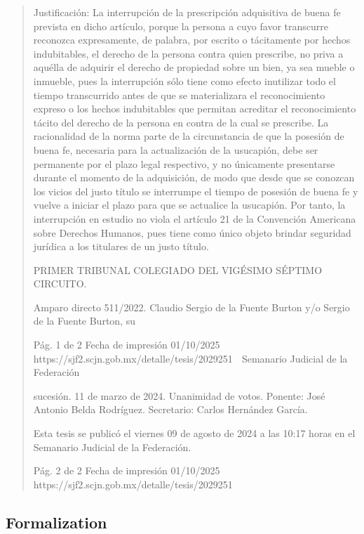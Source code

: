 \documentclass[11pt,a4paper]{article}
\begin{document}
\begin{quote}
Justificación: La interrupción de la prescripción adquisitiva de buena fe prevista en dicho artículo,
porque la persona a cuyo favor transcurre reconozca expresamente, de palabra, por escrito o
tácitamente por hechos indubitables, el derecho de la persona contra quien prescribe, no priva a
aquélla de adquirir el derecho de propiedad sobre un bien, ya sea mueble o inmueble, pues la
interrupción sólo tiene como efecto inutilizar todo el tiempo transcurrido antes de que se
materializara el reconocimiento expreso o los hechos indubitables que permitan acreditar el
reconocimiento tácito del derecho de la persona en contra de la cual se prescribe. La racionalidad
de la norma parte de la circunstancia de que la posesión de buena fe, necesaria para la
actualización de la usucapión, debe ser permanente por el plazo legal respectivo, y no únicamente
presentarse durante el momento de la adquisición, de modo que desde que se conozcan los vicios
del justo título se interrumpe el tiempo de posesión de buena fe y vuelve a iniciar el plazo para que
se actualice la usucapión. Por tanto, la interrupción en estudio no viola el artículo 21 de la
Convención Americana sobre Derechos Humanos, pues tiene como único objeto brindar seguridad
jurídica a los titulares de un justo título.

PRIMER TRIBUNAL COLEGIADO DEL VIGÉSIMO SÉPTIMO CIRCUITO.


Amparo directo 511/2022. Claudio Sergio de la Fuente Burton y/o Sergio de la Fuente Burton, su

                                              Pág. 1 de 2              Fecha de impresión 01/10/2025
  https://sjf2.scjn.gob.mx/detalle/tesis/2029251
                                                  Semanario Judicial de la Federación

sucesión. 11 de marzo de 2024. Unanimidad de votos. Ponente: José Antonio Belda Rodríguez.
Secretario: Carlos Hernández García.


Esta tesis se publicó el viernes 09 de agosto de 2024 a las 10:17 horas en el Semanario Judicial de
la Federación.




                                             Pág. 2 de 2           Fecha de impresión 01/10/2025
 https://sjf2.scjn.gob.mx/detalle/tesis/2029251

\end{quote}

\subsection{Formalization}
\end{document}
